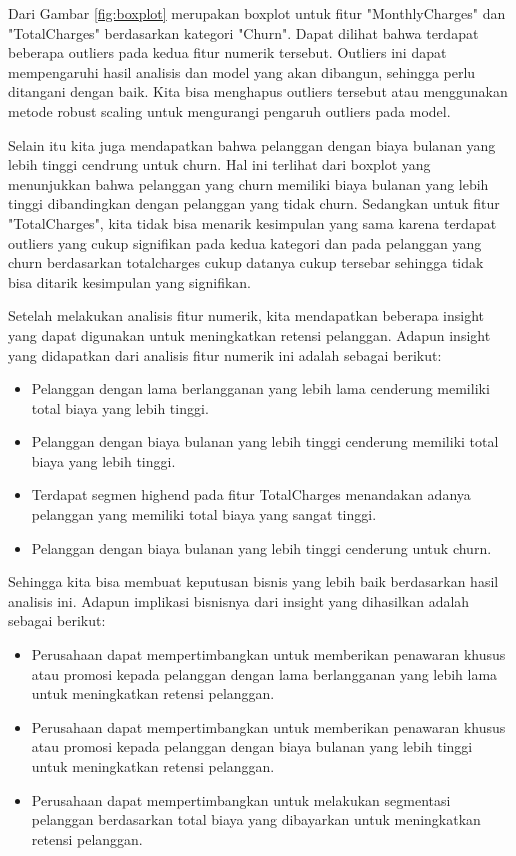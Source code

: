 Dari Gambar \ref{fig:boxplot} merupakan boxplot untuk fitur "MonthlyCharges" dan "TotalCharges" berdasarkan kategori "Churn". Dapat dilihat bahwa terdapat beberapa outliers pada kedua fitur numerik tersebut. Outliers ini dapat mempengaruhi hasil analisis dan model yang akan dibangun, sehingga perlu ditangani dengan baik. Kita bisa menghapus outliers tersebut atau menggunakan metode robust scaling untuk mengurangi pengaruh outliers pada model.

Selain itu kita juga mendapatkan bahwa pelanggan dengan biaya bulanan yang lebih tinggi cendrung untuk churn. Hal ini terlihat dari boxplot yang menunjukkan bahwa pelanggan yang churn memiliki biaya bulanan yang lebih tinggi dibandingkan dengan pelanggan yang tidak churn. Sedangkan untuk fitur "TotalCharges", kita tidak bisa menarik kesimpulan yang sama karena terdapat outliers yang cukup signifikan pada kedua kategori dan pada pelanggan yang churn berdasarkan totalcharges cukup datanya cukup tersebar sehingga tidak bisa ditarik kesimpulan yang signifikan.

Setelah melakukan analisis fitur numerik, kita mendapatkan beberapa insight yang dapat digunakan untuk meningkatkan retensi pelanggan. Adapun insight yang didapatkan dari analisis fitur numerik ini adalah sebagai berikut:
\begin{itemize}
    \item Pelanggan dengan lama berlangganan yang lebih lama cenderung memiliki total biaya yang lebih tinggi.
    \item Pelanggan dengan biaya bulanan yang lebih tinggi cenderung memiliki total biaya yang lebih tinggi.
    \item Terdapat segmen highend pada fitur TotalCharges menandakan adanya pelanggan yang memiliki total biaya yang sangat tinggi.
    \item Pelanggan dengan biaya bulanan yang lebih tinggi cenderung untuk churn.
\end{itemize}

Sehingga kita bisa membuat keputusan bisnis yang lebih baik berdasarkan hasil analisis ini. Adapun implikasi bisnisnya dari insight yang dihasilkan adalah sebagai berikut:

\begin{itemize}
    \item Perusahaan dapat mempertimbangkan untuk memberikan penawaran khusus atau promosi kepada pelanggan dengan lama berlangganan yang lebih lama untuk meningkatkan retensi pelanggan.
    \item Perusahaan dapat mempertimbangkan untuk memberikan penawaran khusus atau promosi kepada pelanggan dengan biaya bulanan yang lebih tinggi untuk meningkatkan retensi pelanggan.
    \item Perusahaan dapat mempertimbangkan untuk melakukan segmentasi pelanggan berdasarkan total biaya yang dibayarkan untuk meningkatkan retensi pelanggan.
\end{itemize}

